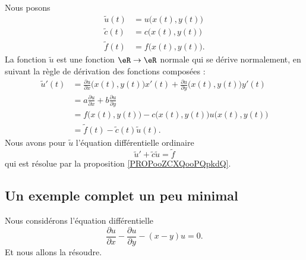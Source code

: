 Nous posons
\begin{subequations}
    \begin{align}
        \tilde u(t)&=u\big( x(t),y(t) \big)\\
        \tilde c(t)&=c\big( x(t),y(t) \big)\\
        \tilde f(t)&=f\big( x(t),y(t) \big).
    \end{align}
\end{subequations}
La fonction \( \tilde u\) est une fonction \( \eR\to \eR\) normale qui se dérive normalement, en suivant la règle de dérivation des fonctions composées :
\begin{subequations}
    \begin{align}
    \tilde u'(t)&=\frac{ \partial u }{ \partial x }\big( x(t),y(t) \big)x'(t)+\frac{ \partial u }{ \partial y }\big( x(t),y(t) \big)y'(t)\\
    &=a\frac{ \partial u }{ \partial x }+b\frac{ \partial u }{ \partial y }\\
    &=f\big( x(t),y(t) \big)-c\big( x(t),y(t) \big)u\big( x(t),y(t) \big)\\
    &=\tilde f(t)-\tilde c(t)\tilde u(t).
    \end{align}
\end{subequations}
Nous avons pour \( \tilde u\) l'équation différentielle ordinaire
\begin{equation}
    \tilde u'+\tilde c\tilde u=\tilde f
\end{equation}
qui est résolue par la proposition \ref{PROPooZCXQooPQpkdQ}.

\subsection{Un exemple complet un peu minimal}

Nous considérons l'équation différentielle\cite{ooEIHMooRXOzwa}
\begin{equation}
    \frac{ \partial u }{ \partial x }-\frac{ \partial u }{ \partial y }-(x-y)u=0.
\end{equation}
Et nous allons la résoudre.

